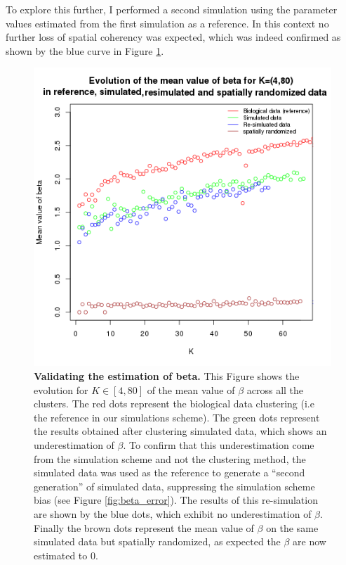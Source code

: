 	 To explore this further, I performed a second simulation using the parameter values estimated from the first simulation as a reference. In this context no further loss of spatial coherency was expected, which was indeed confirmed as shown by the blue curve in Figure \ref{fig:beta_validation}.\\
	
	\begin{figure}[H]
\centerline{\includegraphics[width=0.8\linewidth]{gfx/chapter5/beta_valid.png}}
\caption{{\bf Validating the estimation of beta.} This Figure shows the evolution for $K \in [4,80]$ of the mean value of $\beta$ across all the clusters. The red dots represent the biological data clustering (i.e the reference in our simulations scheme). The green dots represent the results obtained after clustering simulated data, which shows an underestimation of $\beta$. To confirm that this underestimation come from the simulation scheme and not the clustering method, the simulated data was used as the reference to generate a ``second generation'' of simulated data, suppressing the simulation scheme bias (see Figure \ref{fig:beta_error}). The results of this re-simulation are shown by the blue dots, which exhibit no underestimation of $\beta$. Finally the brown dots represent the mean value of $\beta$ on the same simulated data but spatially randomized, as expected the $\beta$ are now estimated to $0$.}
\label{fig:beta_validation}
	\end{figure}
	
